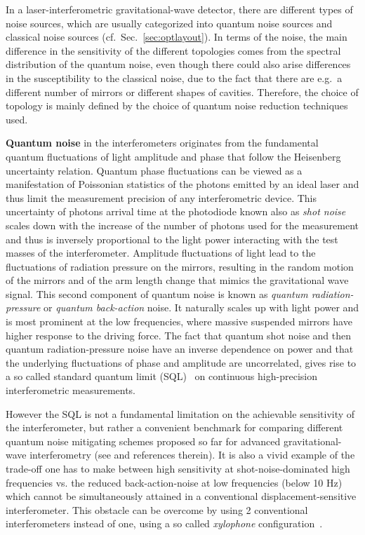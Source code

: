 

In a laser-interferometric gravitational-wave detector, there are different types of noise sources, which are usually categorized into quantum noise sources and classical noise sources (cf.\ Sec.~\ref{sec:optlayout}). In terms of the noise, the main difference in the sensitivity of the different topologies comes from the spectral distribution of the quantum noise, even though there could also arise differences in the susceptibility to the classical noise, due to the fact that there are e.g.\ a different number of mirrors or different shapes of cavities. Therefore, the choice of topology is mainly defined by the choice of quantum noise reduction techniques used.

\textbf{Quantum noise} in the interferometers originates from the fundamental quantum fluctuations of light amplitude and phase that follow the Heisenberg uncertainty relation. Quantum phase fluctuations can be viewed as a manifestation of Poissonian statistics of the photons emitted by an ideal laser and thus limit the measurement precision of any interferometric device. This uncertainty of photons arrival time at the photodiode known also as \textit{shot noise} scales down with the increase of the number of photons used for the measurement and thus is inversely proportional to the light power interacting with the test masses of the interferometer. Amplitude fluctuations of light lead to the fluctuations of radiation pressure on the mirrors, resulting in the random motion of the mirrors and of the arm length change that
mimics the gravitational wave signal. This second component of quantum noise is known as \textit{quantum radiation-pressure} or \textit{quantum back-action} noise. It
naturally scales up with light power and is most prominent at the low frequencies, where massive suspended mirrors have higher response to the driving force. The fact
that quantum shot noise and then quantum radiation-pressure noise have an inverse dependence on power and that the underlying fluctuations of phase and amplitude are uncorrelated, gives rise to a so called standard quantum limit (SQL)~\cite{Braginsky1968,Braginsky1999} on continuous high-precision interferometric measurements. 

However the SQL is not a fundamental limitation on the achievable sensitivity of the interferometer, but rather a convenient benchmark for comparing different quantum noise mitigating schemes proposed so far for advanced gravitational-wave interferometry (see \cite{2019_LivRevRel_Danilishin} and references therein). It is also a vivid example of the trade-off one has to make between high sensitivity at shot-noise-dominated high frequencies vs. the reduced back-action-noise at low frequencies (below 10 Hz) which cannot be simultaneously attained in a conventional displacement-sensitive interferometer. This obstacle can be overcome by using 2 conventional interferometers instead of one, using a so called \textit{xylophone} configuration~\cite{Hild2010a}. 

